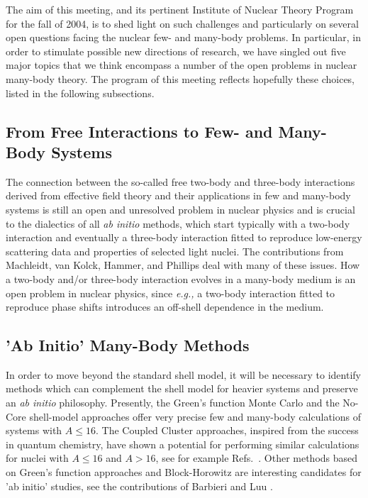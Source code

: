 \documentclass[12pt]{iopart}
\begin{document}
The aim of this meeting, and its pertinent Institute of Nuclear 
Theory Program for the fall of 2004, is to shed light  
on such challenges and particularly 
on several open questions facing the 
nuclear few- and many-body problems. In 
particular, in order to stimulate possible 
new directions of research, we have singled out 
five major topics that we think encompass
a number of the open problems in nuclear many-body theory. 
The program of this meeting 
reflects hopefully these choices, 
listed in the following subsections.

\subsection{From Free Interactions to Few- and Many-Body Systems}  

The connection between the so-called free two-body and three-body interactions
derived from effective field theory and their applications in few and many-body 
systems is still an open and unresolved problem in nuclear physics and is 
crucial to the dialectics of all {\it ab initio} methods, which start 
typically with a two-body interaction and eventually a three-body interaction 
fitted to reproduce low-energy scattering data and properties
of selected light nuclei. The contributions from Machleidt, van Kolck, Hammer,
and Phillips deal with many of these issues.  How a 
two-body and/or three-body interaction evolves in a many-body medium is an 
open problem in nuclear physics, since {\it e.g.,} a two-body interaction 
fitted to reproduce phase shifts introduces an off-shell dependence 
in the medium.

\subsection{'Ab Initio' Many-Body Methods}

In order to move beyond the standard shell model, it will be necessary to
identify methods which can complement the shell model for heavier 
systems and preserve an {\it ab initio} philosophy. Presently, 
the Green's function Monte Carlo
\cite{bobsteve1,bobsteve2} and the No-Core 
shell-model \cite{bruce1,bruce2,bruce3}
approaches offer very precise few and many-body 
calculations of systems with 
$A\le 16$.   The Coupled Cluster approaches, inspired 
from the success in quantum chemistry, have shown a 
potential for performing similar calculations
for nuclei with $A\le 16$ and $A> 16$, see for 
example Refs.~\cite{cc1,cc2}.
Other methods based on Green's function approaches and 
Block-Horowitz are interesting candidates for 'ab initio' studies, see the 
contributions of Barbieri \cite{carlo} and Luu \cite{tom}.
\end{document}
